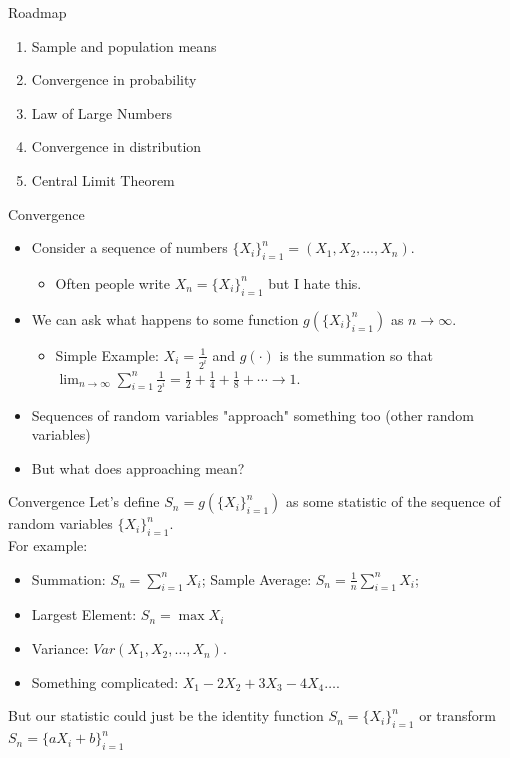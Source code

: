 \begin{frame}{Roadmap}
\begin{enumerate}
	\item Sample and population means
	\item Convergence in probability
	\item Law of Large Numbers
	\item Convergence in distribution
	\item Central Limit Theorem
\end{enumerate}
\end{frame}

\begin{frame}{Convergence}
\begin{itemize}
	\item Consider a sequence of numbers $\{X_i\}_{i=1}^n = \left(X_1,X_2,\ldots,X_n\right)$.
	\begin{itemize}
		\item Often people write $X_n =  \{X_i\}_{i=1}^n$ but I hate this.
	\end{itemize}
	\item We can ask what happens to some function $g(\{X_i\}_{i=1}^n)$ as $n \rightarrow \infty$.
	\begin{itemize}
		\item Simple Example: $X_i = \frac{1}{2^i}$ and $g(\cdot)$ is the summation so that $\lim_{n \rightarrow \infty}\sum_{i=1}^n \frac{1}{2^i} =  \frac{1}{2} + \frac{1}{4} + \frac{1}{8} + \cdots \rightarrow 1$.
	\end{itemize}
	\item Sequences of \alert{random variables} "approach" something too (other \alert{random variables})
	\item But what does \alert{approaching} mean?
\end{itemize}
\end{frame}

\begin{frame}{Convergence}
Let's define $S_n = g( \{X_i\}_{i=1}^n)$ as some \alert{statistic} of the sequence of random variables $\{X_i\}_{i=1}^n$.\\
 For example:
\begin{itemize}
	\item Summation: $S_n = \sum_{i=1}^n X_i$; Sample Average: $S_n = \frac{1}{n}\sum_{i=1}^n X_i$;
	\item Largest Element: $S_n = \max  X_i$
	\item Variance: $Var(X_1,X_2,\ldots,X_n)$.
	\item Something complicated: $X_1 - 2 X_2 + 3 X_3 - 4 X_4 \ldots$.
\end{itemize}
But our statistic could just be the identity function $S_n = \{X_i\}_{i=1}^n$ or transform $S_n = \{a X_i +b\}_{i=1}^n$ 
\end{frame}



